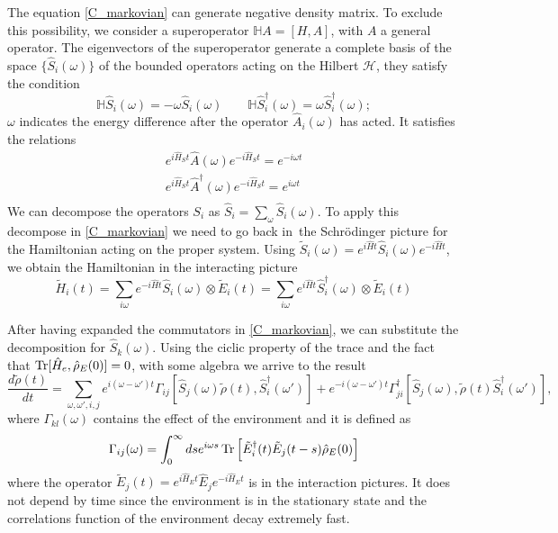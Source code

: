 The equation \eqref{C_markovian} can generate negative density matrix. To exclude this possibility, we consider a superoperator $\mathbb{H} A = \left[H,A\right]$, with $A$ a general operator. The eigenvectors of the superoperator generate a complete basis of the space $\{\hat S_i(\omega)\}$ of the bounded operators acting on the Hilbert $\mathcal{H}$, they satisfy the condition
\begin{equation}
    \mathbb{H}\hat S_i(\omega) = -\omega \hat S_i(\omega) \qquad \mathbb{H}\hat S_i^\dagger(\omega) = \omega \hat S_i^\dagger(\omega);
\end{equation}
$\omega$ indicates the energy difference after the operator $\hat A_i(\omega)$ has acted.
It satisfies the relations
\begin{equation}
    \begin{split}
        e^{i\hat H_St}\hat A(\omega)e^{-i\hat H_St} = e^{-i\omega t}\\
        e^{i\hat H_St}\hat A^\dagger(\omega)e^{-i\hat H_St} = e^{i\omega t}\\
    \end{split}
\end{equation}
We can decompose the operators $S_i$ as $\hat S_i = \sum_\omega \hat S_i(\omega)$.
To apply this decompose in \eqref{C_markovian} we need to go back in\ the Schrödinger picture for the Hamiltonian acting on the proper system. Using $\tilde S_i(\omega)=e^{i\hat Ht}\hat S_i(\omega)e^{-i\hat H t}$, we obtain the Hamiltonian in the interacting picture
\begin{equation}\label{eigen_Hamiltonian}
    \tilde H_i(t) = \sum_{i\omega} e^{-i\hat Ht}\hat S_i(\omega) \otimes \tilde E_i (t)= \sum_{i\omega} e^{i\hat Ht}\hat S_i^\dagger(\omega) \otimes \tilde E_i (t)
\end{equation}

After having expanded the commutators in \eqref{C_markovian}, we can substitute the decomposition for $\hat S_k(\omega)$. Using the ciclic property of the trace and the fact that $\operatorname{Tr}[\hat H_e,\hat\rho_E(0)]=0$, with some algebra we arrive to the result
\begin{equation}\label{c_substitue}
    \frac{d\tilde\rho(t)}{dt} = \sum_{\omega,\omega',i,j}e^{i(\omega-\omega')t}\Gamma_{ij}\left[\hat S_j(\omega)\tilde\rho(t),\hat S_i^\dagger(\omega')\right]+ e^{-i(\omega-\omega')t}\Gamma_{ji}^\dagger\left[\hat S_j(\omega),\tilde\rho(t)\hat S_i^\dagger(\omega')\right],
\end{equation}
where $\Gamma_{kl}(\omega)$ contains the effect of the environment and it is defined as
\begin{equation}\label{environment_coefficients}
    \Gamma_{ij}(\omega) = \int_{0}^{\infty}ds e^{i\omega s}\operatorname{Tr}\left[\tilde E_i^\dagger(t)\tilde E_j(t-s)\hat\rho_E(0)\right]
\end{equation}
where the operator $\tilde E_j(t)=e^{i\hat H_E t}\hat E_j e^{-i\hat H_E t}$ is in the interaction pictures. It does not depend by time since the environment is in the stationary state and the correlations function of the environment decay extremely fast.


